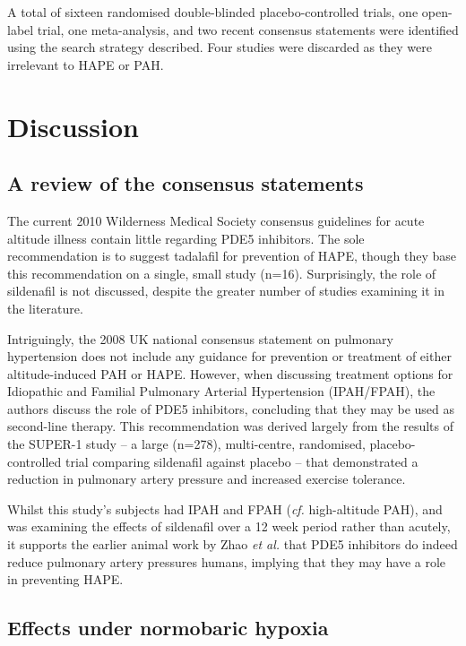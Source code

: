 \documentclass[12pt,a4paper]{article}
\begin{document}
A total of sixteen randomised double-blinded placebo-controlled trials, one open-label trial, one meta-analysis, and two recent consensus statements were identified using the search strategy described. Four studies were discarded as they were irrelevant to HAPE or PAH.

\section*{Discussion}

\subsection*{A review of the consensus statements}

The current 2010 Wilderness Medical Society consensus guidelines for acute altitude illness contain little regarding PDE5 inhibitors.\cite{Luks:2010ht} The sole recommendation is to suggest tadalafil for prevention of HAPE, though they base this recommendation on a single, small study (n=16).\cite{Maggiorini:2006kz} Surprisingly, the role of sildenafil is not discussed, despite the greater number of studies examining it in the literature.

Intriguingly, the 2008 UK national consensus statement on pulmonary hypertension does not include any guidance for prevention or treatment of either altitude-induced PAH or HAPE.\cite{NationalPulmonaryHypertensionCentresoftheUKandIreland:2008jh} However, when discussing treatment options for Idiopathic and Familial Pulmonary Arterial Hypertension (IPAH/FPAH), the authors discuss the role of PDE5 inhibitors, concluding that they may be used as second-line therapy. This recommendation was derived largely from the results of the SUPER-1 study -- a large (n=278), multi-centre, randomised, placebo-controlled trial comparing sildenafil against placebo -- that demonstrated a reduction in pulmonary artery pressure and increased exercise tolerance.\cite{Galie:2005gx}

Whilst this study's subjects had IPAH and FPAH (\emph{cf.} high-altitude PAH), and was examining the effects of sildenafil over a 12 week period rather than acutely, it supports the earlier animal work by Zhao \emph{et al.}\cite{Zhao:2001kj} that PDE5 inhibitors do indeed reduce pulmonary artery pressures humans, implying that they may have a role in preventing HAPE.

\subsection*{Effects under normobaric hypoxia}
\end{document}
